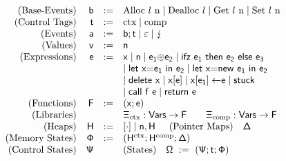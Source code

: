 \documentclass[dvipsnames,conference]{IEEEtran}
\theoremstyle{definition}
\begin{document}
\vspace{-.5em}
{
  \renewcommand{\src}[1]{\mathsf{#1}}
\[
  \begin{array}{rrcl}
    \text{(Base-Events)} & \src{\preevent} &:=& \src{\ev{Alloc \loc\ n}} \mid \src{\ev{Dealloc \loc}} \mid \src{\ev{Get \loc\ n}} \mid \src{\ev{Set \loc\ n}} \\
    \text{(Control Tags)} & \src{\sandboxtag{}} &:=& \src{\ctx} \mid \src{\comp} \\
    \text{(Events)} & \src{\event} &:=& \src{\preevent;\sandboxtag{}} \mid \src{\emptyevent} \mid \src{\lightning} \\ 
    \text{(Values)} & \src{v} &:=& \src{n} \\
    \text{(Expressions)} & \src{\expr} &:=& \src{x} \mid \src{n} \mid \src{\lbinop{\expr[_1]}{\expr[_2]}} \mid \src{\lifz{\expr[_1]}{\expr[_2]}{\expr[_3]}} \\ 
                         &&&\mid \src{\llet{x}{\expr[_1]}{\expr[_2]}} \mid \src{\llet{x}{new\ \expr[_1]}{\expr[_2]}} \\
                         &&&\mid \src{\ldelete{x}} \mid \src{\lget{x}{\expr}} \mid \src{\lset{x}{\expr[_1]}{\expr[]}} \mid \src{stuck}\\
                         &&&\mid \src{\lcall{f}{\expr}} \mid \src{\lreturn{\expr}} \\
    \text{(Functions)} & \src{F} &:=& (\src{x};\src{\expr}) \\
    \text{(Libraries)} &&& \src{\library_{\ctx}} : \src{Vars} \to \src{F} \hspace{2em}
    \src{\library_{\comp}} : \src{Vars} \to \src{F} \\
    \text{(Heaps)} & \src{H} &:=& \src{\hole{\cdot}} \mid \src{n},\src{H}\hspace{0.5cm}    \text{(Pointer Maps)}\ \ \ \src{\Delta} \\
    \text{(Memory States)} & \src{\memstate} &:=& \left(\src{H^{\ctx}};\src{H^{\comp}};\src{\Delta}\right)\\
  \text{(Control States)} & \src{\cfstate} & & \text{(States)}\ \ \ \src{\Omega}\ :=\ \left(\src{\cfstate};\src{\sandboxtag{}};\src{\memstate}\right)\\
  \end{array}
\]
}
\end{document}

